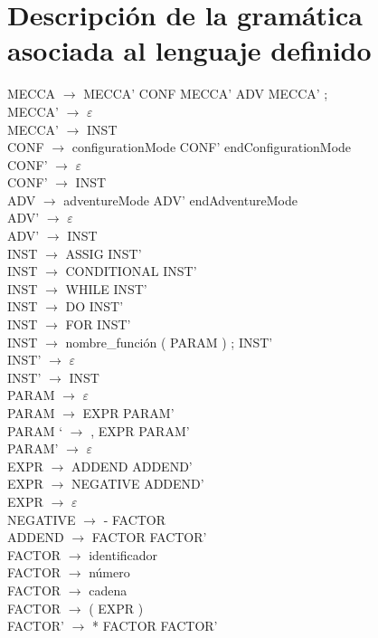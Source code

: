 \documentclass[a4paper,12pt,twoside,openright]{report}
\begin{document}
  \chapter{Descripción de la gramática asociada al lenguaje definido \label{defgra}}
MECCA $\rightarrow$ MECCA’ CONF MECCA’ ADV MECCA’ ;\\
MECCA’ $\rightarrow$ $\varepsilon$\\
MECCA’ $\rightarrow$ INST\\
CONF $\rightarrow$ configurationMode CONF’ endConfigurationMode\\
CONF’ $\rightarrow$ $\varepsilon$\\
CONF’ $\rightarrow$ INST\\
ADV $\rightarrow$ adventureMode ADV’ endAdventureMode\\
ADV’ $\rightarrow$ $\varepsilon$\\
ADV’ $\rightarrow$ INST\\
INST $\rightarrow$ ASSIG INST’\\
INST $\rightarrow$ CONDITIONAL INST’\\
INST $\rightarrow$ WHILE INST’\\
INST $\rightarrow$ DO INST’\\
INST $\rightarrow$ FOR INST’\\
INST $\rightarrow$ nombre\_función ( PARAM ) ; INST’\\
INST’ $\rightarrow$ $\varepsilon$\\
INST’ $\rightarrow$ INST\\
PARAM $\rightarrow$ $\varepsilon$\\
PARAM $\rightarrow$ EXPR PARAM’\\
PARAM ‘ $\rightarrow$ , EXPR PARAM’\\
PARAM’ $\rightarrow$ $\varepsilon$\\
EXPR $\rightarrow$ ADDEND ADDEND’\\
EXPR $\rightarrow$ NEGATIVE ADDEND’\\
EXPR $\rightarrow$ $\varepsilon$\\
NEGATIVE $\rightarrow$ - FACTOR\\
ADDEND $\rightarrow$ FACTOR FACTOR’\\
FACTOR $\rightarrow$ identificador\\
FACTOR $\rightarrow$ número\\
FACTOR $\rightarrow$ cadena\\
FACTOR $\rightarrow$ ( EXPR )\\
FACTOR’ $\rightarrow$ * FACTOR FACTOR’\\
\end{document}
